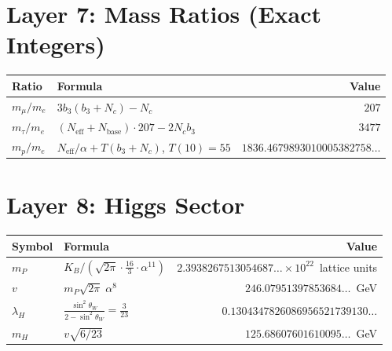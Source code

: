 \documentclass[11pt,a4paper]{article}
\begin{document}
\section*{Layer 7: Mass Ratios (Exact Integers)}

\begin{longtable}{lp{6cm}r}
\toprule
\textbf{Ratio} & \textbf{Formula} & \textbf{Value} \\
\midrule
\endhead
$m_\mu/m_e$ & $3b_3(b_3 + N_c) - N_c$ & $207$ \\[4pt]
$m_\tau/m_e$ & $(N_{\mathrm{eff}} + N_{\mathrm{base}})\cdot 207 - 2N_c b_3$ & $3477$ \\[4pt]
$m_p/m_e$ & $N_{\mathrm{eff}}/\alpha + T(b_3\!+\!N_c)$, \; $T(10) = 55$ &
$1836.4679893010005382758\ldots$ \\
\bottomrule
\end{longtable}

\section*{Layer 8: Higgs Sector}

\begin{longtable}{lp{5.5cm}r}
\toprule
\textbf{Symbol} & \textbf{Formula} & \textbf{Value} \\
\midrule
\endhead
$m_P$ & $K_B / (\sqrt{2\pi}\cdot\tfrac{16}{3}\cdot\alpha^{11})$ &
$2.3938267513054687\ldots \times 10^{22}$~lattice units\rlap{$^{\dagger}$} \\[4pt]
$v$ & $m_P\sqrt{2\pi}\;\alpha^8$ &
$246.07951397853684\ldots$~GeV \\[6pt]
$\lambda_H$ & $\displaystyle\frac{\sin^2\!\theta_W}{2 - \sin^2\!\theta_W} = \frac{3}{23}$ &
$0.1304347826086956521739130\ldots$ \\[8pt]
$m_H$ & $v\sqrt{6/23}$ &
$125.68607601610095\ldots$~GeV \\
\bottomrule
\end{longtable}

\end{document}
